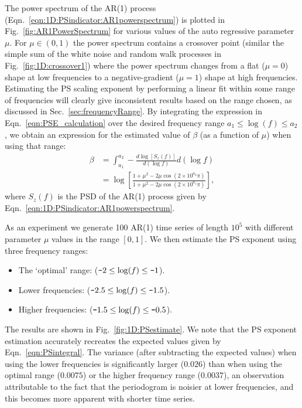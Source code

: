 \documentclass[10pt]{iopart}
\newcommand{\m}{\textup{\texttt{-}}}
\begin{document}
The power spectrum of the AR(1) process (Eqn.~\ref{eqn:1D:PSindicator:AR1powerspectrum}) is plotted in Fig.~\ref{fig:AR1PowerSpectrum} for various values of the auto regressive parameter $\mu$. For $\mu\in(0,1)$ the power spectrum contains a crossover point (similar the simple sum of the white noise and random walk processes in Fig.~\ref{fig:1D:crossover1}) where the power spectrum changes from a flat ($\mu=0$) shape at low frequencies to a negative-gradient ($\mu=1$) shape at high frequencies. Estimating the PS scaling exponent by performing a linear fit within some range of frequencies will clearly give inconsistent results based on the range chosen, as discussed in Sec.~\ref{sec:frequencyRange}. By integrating the expression in Eqn.~\ref{eqn:PSE_calculation} over the desired frequency range $a_1\leq\log(f)\leq a_2$, we obtain an expression for the estimated value of $\beta$ (as a function of $\mu$) when using that range:
\begin{eqnarray}
		\beta &= \int_{a_1}^{a_2}-\frac{d\log\left[S_z(f)\right]}{d(\log f)}d(\log f)\nonumber\\
		&= \log\left[  \frac{1+\mu^2-2\mu \cos(2\times10^{a_2}\pi)}{1+\mu^2-2\mu \cos(2\times10^{a_1}\pi)}  \right],
		\label{eqn:PSintegral}
\end{eqnarray}
where $S_z(f)$ is the PSD of the AR(1) process given by Eqn.~\ref{eqn:1D:PSindicator:AR1powerspectrum}.

As an experiment we generate 100 AR(1) time series of length $10^5$ with different parameter $\mu$ values in the range $[0, 1]$. We then estimate the PS exponent using three frequency ranges:
\begin{itemize}
	\item The `optimal' range: ($\m2\leq\log(f)\leq\m1$).
	\item Lower frequencies: ($\m2.5\leq\log(f)\leq\m1.5$).
	\item Higher frequencies: ($\m1.5\leq\log(f)\leq\m0.5$).
\end{itemize}
The results are shown in Fig.~\ref{fig:1D:PSestimate}. We note that the PS exponent estimation accurately recreates the expected values given by Eqn.~\ref{eqn:PSintegral}. The variance (after subtracting the expected values) when using the lower frequencies is significantly larger ($0.026$) than when using the optimal range ($0.0075$) or the higher frequency range ($0.0037$), an observation attributable to the fact that the periodogram is noisier at lower frequencies, and this becomes more apparent with shorter time series. 
\end{document}
